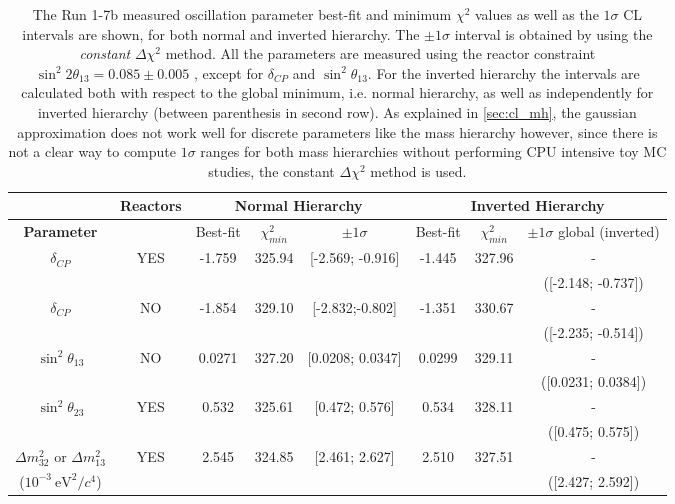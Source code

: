 \begin{table}[htb]
\centering
\begin{tabular}{| c | c || c | c | c || c | c | c |}
\hline
								& {\bf Reactors}		& \multicolumn{3}{c||}{\bf Normal Hierarchy} & \multicolumn{3}{c|}{\bf Inverted Hierarchy} \\
\hline										
\bf Parameter						&				& Best-fit	& $\chi^2_{min}$	& $\pm 1\sigma$ 	  	 	& Best-fit		& $\chi^2_{min}$ 	& $\pm 1\sigma$ global (inverted) 	 \\
\hline
$\delta_{CP}$             				& YES      			& -1.759  	& 325.94			& [-2.569; -0.916]			& -1.445		& 327.96			& -							\\
								& 				& 		& 				& 						& 			& 				& ([-2.148; -0.737])				\\ 
\hline
$\delta_{CP}$            				& NO        			& -1.854  	& 329.10			& [-2.832;-0.802]  			& -1.351		& 330.67			& -				\\
								& 				& 		& 				& 						& 			& 				& ([-2.235; -0.514]) 				\\ 
\hline
$\sin^2 \theta_{13}$    				& NO             		& 0.0271  	& 327.20			& [0.0208; 0.0347]	        		& 0.0299		& 329.11			& -							\\
								& 				& 		& 				& 						& 			& 				& ([0.0231; 0.0384]) 				\\ 
\hline
$\sin^2 \theta_{23}$                      		& YES       		& 0.532	& 325.61			& [0.472; 0.576]			& 0.534		& 328.11			& -                 					\\
								& 				& 		& 				& 						& 			& 				& ([0.475; 0.575])			  	\\ 
\hline
$\Delta m^2_{32}$ or $\Delta m^2_{13}$   & YES  			& 2.545 	& 324.85 			& [2.461; 2.627]			& 2.510 		& 327.51			& -     						\\
($10^{-3} ~\text{eV}^2 / c^4$) 			& 				& 		&				&						&			&				& ([2.427; 2.592])				\\

\hline
\end{tabular}
\caption{
The Run 1-7b measured oscillation parameter best-fit
and minimum $\chi^2$ 
values  
as well as the 
$1\sigma$ 
CL intervals are shown,
for both normal and inverted hierarchy. 
The $\pm1\sigma$ interval is obtained by using the 
\emph{constant} $\Delta \chi^2$ method.
All the parameters are measured using the reactor constraint 
$\sin^2 2\theta_{13} = 0.085 \pm 0.005 $
\cite{pdg_2014},
except for $\delta_{CP}$ and $\sin^2 \theta_{13}$.
For the inverted hierarchy the intervals are calculated both with respect to 
the global minimum, i.e. normal hierarchy, as well as 
independently for inverted hierarchy (between parenthesis in second row).
As explained in \cref{sec:cl_mh}, the gaussian approximation does not work well 
for discrete parameters like the mass hierarchy however, since there is not a clear way
to compute $1\sigma$ ranges for both mass hierarchies without performing
CPU intensive toy MC studies, the constant $\Delta \chi^2$ method is used.
}                                                                                                                                                                                          
\label{tab:joint_bestfit_run17b}
\end{table}
